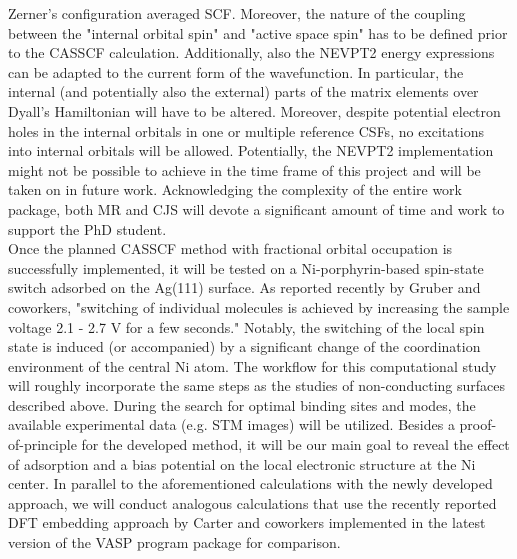 \documentclass[a4paper,11pt,headings=normal]{scrartcl}
\begin{document}
Zerner's configuration averaged SCF.\autocite{Zerner1989a} Moreover, 
the nature of the coupling between the "internal orbital spin" and "active 
space spin" has to be defined prior to the CASSCF calculation. Additionally, 
also the NEVPT2 energy expressions can be adapted to the current form 
of the wavefunction. In particular, the internal (and potentially also the 
external) parts of the matrix elements over Dyall's Hamiltonian will have to be 
altered. Moreover, despite potential electron holes in the internal orbitals in 
one or multiple reference CSFs, no excitations into internal orbitals will be 
allowed. Potentially, the NEVPT2 implementation might not be possible to 
achieve in the time frame of this project and will be taken on in future work. 
Acknowledging the complexity of the entire work package, both MR and CJS will devote a significant amount 
of time and work to support the PhD student.\\
Once the planned CASSCF method with fractional orbital occupation is successfully 
implemented, it will be 
tested on a Ni-porphyrin-based spin-state switch adsorbed on the Ag(111) 
surface. As reported recently by Gruber and coworkers,\autocite{Gruber2020} 
"switching of individual molecules is achieved by increasing the sample voltage 
2.1 - 2.7 V for a few seconds." Notably, the switching of the local spin state 
is induced (or accompanied) by a significant change of the coordination 
environment of the central Ni atom. The workflow for this computational study 
will roughly incorporate the same steps as the studies of non-conducting 
surfaces described above. During the search for optimal binding sites and 
modes, the available experimental data (e.g. STM images) will be utilized. 
Besides a proof-of-principle for the developed method, it will be our main goal 
to reveal the effect of adsorption and a bias potential on the local electronic 
structure at the Ni center. In parallel to the aforementioned calculations with the 
newly developed approach, we will conduct analogous calculations that use the 
recently reported DFT embedding approach by Carter and 
coworkers\autocite{Carter2024} implemented in the latest version of the VASP 
program package for comparison.\\
\end{document}
